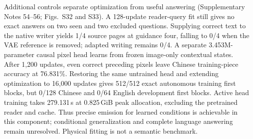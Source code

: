 Additional controls separate optimization from useful answering
(Supplementary Notes 54--56; Figs.~S32 and S33). A 128-update reader-query fit
still gives no exact answers on two seen and two excluded questions.
Supplying correct text to the native writer yields 1/4 source pages at
guidance four, falling to 0/4 when the VAE reference is removed; adapted
writing remains 0/4. A separate 3.453M-parameter causal pixel head learns
from frozen image-only contextual states. After 1,200 updates, even correct
preceding pixels leave Chinese training-piece accuracy at 76.831\%.
Restoring the same untrained head and extending optimization to 16,000
updates gives 512/512 exact autonomous training first blocks, but 0/128
Chinese and 0/64 English development first blocks. Active head training
takes 279.131\,s at 0.825\,GiB peak allocation, excluding the pretrained
reader and cache. Thus precise emission for learned conditions is achievable
in this component; conditional generalization and complete language answering
remain unresolved. Physical fitting is not a semantic benchmark.
